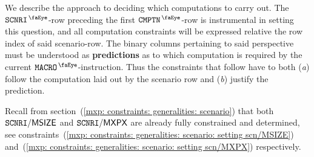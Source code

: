We describe the approach to deciding which computations to carry out.
The $\isMxpScenario$-row preceding the first $\isMxpComputation$-row is instrumental in setting this question,
and all computation constraints will be expressed relative the row index of said scenario-row.
The binary columns pertaining to said perspective must be understood as \textbf{predictions} as to which computation is required by the current $\isMxpMacro$-instruction.
Thus the constraints that follow have to both
(\emph{a}) follow the computation laid out by the scenario row and
(\emph{b}) justify the prediction.

Recall from
section~(\ref{mxp: constraints: generalities: scenario})
that both $\texttt{SCNRI}\textsf{/}{\textsf{MSIZE}}$ and $\texttt{SCNRI}\textsf{/}{\textsf{MXPX}}$ are already fully constrained and determined,
see constraints~(\ref{mxp: constraints: generalities: scenario: setting scn/MSIZE})
and~(\ref{mxp: constraints: generalities: scenario: setting scn/MXPX})
respectively.


 \label{mxp: computations: decision tree}
